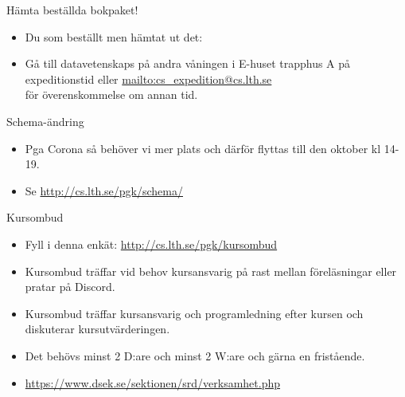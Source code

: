 
\ifkompendium\else
\begin{SlideExtra}{Hämta beställda bokpaket!}
  \begin{itemize}
    \item Du som beställt  men  hämtat ut det: \\
    \item[] Gå till datavetenskaps  på andra våningen i E-huset trapphus A på expeditionstid eller \url{mailto:cs_expedition@cs.lth.se} \\ för överenskommelse om annan tid. 
  \end{itemize}
\end{SlideExtra}


\begin{SlideExtra}{Schema-ändring}
  \begin{itemize}
    \item Pga Corona så behöver vi mer plats och därför flyttas  till den  oktober kl 14-19.
    \item Se \url{http://cs.lth.se/pgk/schema/}
  \end{itemize}
\end{SlideExtra}
  
\begin{SlideExtra}{Kursombud}
\begin{itemize}
\item Fyll i denna enkät: \url{http://cs.lth.se/pgk/kursombud}
\item Kursombud träffar vid behov kursansvarig på rast mellan föreläsningar eller pratar på Discord.
\item Kursombud träffar kursansvarig och programledning efter kursen och diskuterar kursutvärderingen.
\item Det behövs minst 2 D:are och minst 2 W:are och gärna en fristående.
\item {\SlideFontSmall\url{https://www.dsek.se/sektionen/srd/verksamhet.php}}
\end{itemize}
\end{SlideExtra}
\fi
